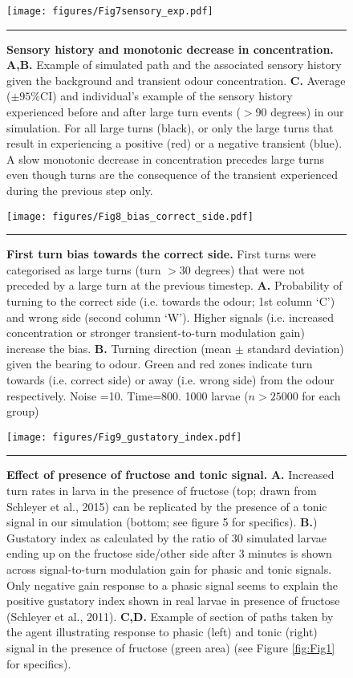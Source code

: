 \documentclass[10pt,a4paper]{article}
\begin{document}
\begin{figure}[!ht]
\begin{center}
\texttt{[image: figures/Fig7sensory\_exp.pdf]}
\caption{{\bf Sensory history and monotonic decrease in concentration.} {\bf A,B.} Example of simulated path and the associated sensory history given the background and transient odour concentration.
{\bf  C.} Average ($\pm 95\%$CI) and individual’s example of the sensory history experienced before and after large turn events ($>90$ degrees) in our simulation. For all large turns (black), or only the large turns that result in experiencing a positive (red) or a negative transient (blue). A slow monotonic decrease in concentration precedes large turns even though turns are the consequence of the transient experienced during the previous step only.
\label{fig:Fig7}}
\hrule
\end{center}
\end{figure}


\begin{figure}[!ht]
\begin{center}
\texttt{[image: figures/Fig8\_bias\_correct\_side.pdf]}
\caption{{\bf First turn bias towards the correct side.} First turns were categorised as large turns (turn $>30$ degrees) that were not preceded by a large turn at the previous timestep.
{\bf A.} Probability of turning to the correct side (i.e. towards the odour; 1st column ‘C’) and wrong side (second column ‘W’). Higher signals (i.e. increased concentration or stronger transient-to-turn modulation gain) increase the bias.
{\bf B.} Turning direction (mean $\pm$ standard deviation) given the bearing to odour. Green and red zones indicate turn towards (i.e. correct side) or away (i.e. wrong side) from the odour respectively. Noise =10. Time=800. 1000 larvae ($n > 25000$ for each group)
\label{fig:Fig8}}
\hrule
\end{center}
\end{figure}


\begin{figure}[!ht]
\begin{center}
\texttt{[image: figures/Fig9\_gustatory\_index.pdf]}
\caption{{\bf Effect of presence of fructose and tonic signal.}
{\bf A.} Increased turn rates in larva in the presence of fructose (top; drawn from Schleyer et al., 2015) can be replicated by the presence of a tonic signal in our simulation (bottom; see figure 5 for specifics).
{\bf B.}) Gustatory index as calculated by the ratio of 30 simulated larvae ending up on the fructose side/other side after 3 minutes is shown across signal-to-turn modulation gain for phasic and tonic signals. Only negative gain response to a phasic signal seems to explain the positive gustatory index shown in real larvae in presence of fructose (Schleyer et al., 2011).
{\bf C,D.} Example of section of paths taken by the agent illustrating response to phasic (left) and tonic (right) signal in the presence of fructose (green area) (see Figure \ref{fig:Fig1} for specifics).
\label{fig:Fig9}}
\hrule
\end{center}
\end{figure}
\end{document}
